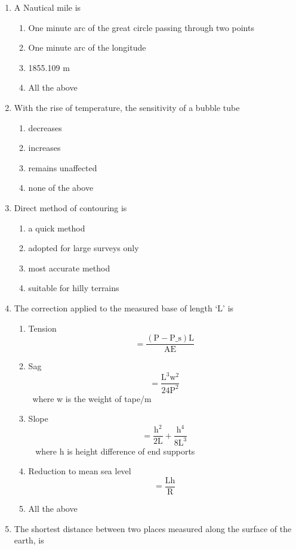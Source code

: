 \documentclass[11pt,a4paper]{article}
\begin{document}
\begin{enumerate}
\begin{enumerate}[label=\Alph*.]
\end{enumerate}
\item{A Nautical mile is}
\begin{enumerate}[label=\Alph*.]
\item{One minute arc of the great circle passing through two points}
\item{One minute arc of the longitude}
\item{1855.109 m}
\item{All the above}
\end{enumerate}
\item{With the rise of temperature, the sensitivity of a bubble tube}
\begin{enumerate}[label=\Alph*.]
\item{decreases}
\item{increases}
\item{remains unaffected}
\item{none of the above}
\end{enumerate}
\item{Direct method of contouring is}
\begin{enumerate}[label=\Alph*.]
\item{a quick method}
\item{adopted for large surveys only}
\item{most accurate method}
\item{suitable for hilly terrains}
\end{enumerate}
\item{The correction applied to the measured base of length `L' is
}
\begin{enumerate}[label=\Alph*.]
\item{Tension $$ = \frac{{\left( {{\text{P}} - {{\text{P}}\_{\text{s}}}} \right){\text{L}}}}{{{\text{AE}}}}$$}
\item{Sag $$ = \frac{{{{\text{L}}^3}{{\text{w}}^2}}}{{24{{\text{P}}^2}}}$$ ~where w is the weight of tape/m}
\item{Slope $$ = \frac{{{{\text{h}}^2}}}{{2{\text{L}}}} + \frac{{{{\text{h}}^4}}}{{8{{\text{L}}^3}}}$$ ~ where h is height difference of end supports}
\item{Reduction to mean sea level $$ = \frac{{{\text{Lh}}}}{{\text{R}}}$$}
\item{All the above}
\end{enumerate}
\item{The shortest distance between two places measured along the surface of the earth, is}
\begin{enumerate}[label=\Alph*.]

\end{enumerate}
\end{enumerate}
\end{document}
